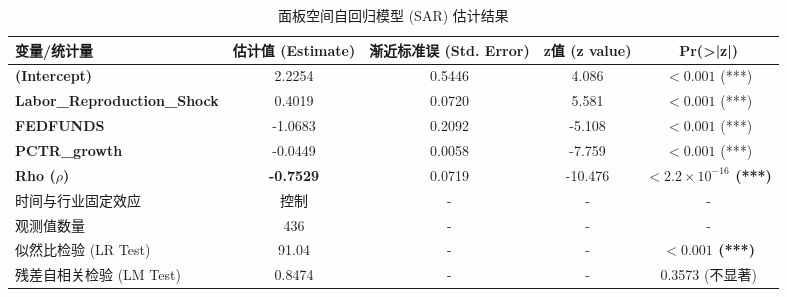 \documentclass[UTF8,a4paper,11pt]{ctexart}
\begin{document}
\begin{table}[H]
\centering
\caption{面板空间自回归模型 (SAR) 估计结果}
\label{tab:sar_results}
\begin{tabular}{lcccc}
\toprule
变量/统计量 & 估计值 (Estimate) & 渐近标准误 (Std. Error) & z值 (z value) & Pr(>|z|) \\
\midrule
\textbf{(Intercept)} & 2.2254 & 0.5446 & 4.086 & $< 0.001$ (***) \\
\textbf{Labor\_Reproduction\_Shock} & 0.4019 & 0.0720 & 5.581 & $< 0.001$ (***) \\
\textbf{FEDFUNDS} & -1.0683 & 0.2092 & -5.108 & $< 0.001$ (***) \\
\textbf{PCTR\_growth} & -0.0449 & 0.0058 & -7.759 & $< 0.001$ (***) \\
\midrule
\textbf{Rho ($\rho$)} & \textbf{-0.7529} & 0.0719 & -10.476 & \textbf{$< 2.2\times 10^{-16}$ (***)} \\
\midrule
时间与行业固定效应 & 控制 & - & - & - \\
观测值数量 & 436 & - & - & - \\
似然比检验 (LR Test) & 91.04 & - & - & \textbf{$< 0.001$ (***)} \\
残差自相关检验 (LM Test) & 0.8474 & - & - & 0.3573 (不显著) \\
\bottomrule
\end{tabular}
\end{table}
\end{document}
